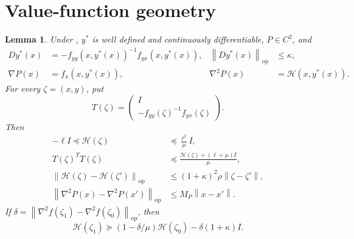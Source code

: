 \documentclass[11pt]{article}
\numberwithin{equation}{section}
\newtheorem{lemma}[assumption]{Lemma}
\newcommand{\norm}[1]{\left\lVert#1\right\rVert}
\newcommand{\op}{\mathrm{op}}
\newcommand{\MP}{M_P}
\begin{document}
\section{Value-function geometry}

\begin{lemma}\label{lem:geometry}
Under , $y^*$ is well defined and continuously
differentiable, $P\in C^2$, and
\begin{align}
 Dy^*(x)&=-f_{yy}(x,y^*(x))^{-1}f_{yx}(x,y^*(x)),
 &\norm{Dy^*(x)}_{\op}&\le\kappa,\label{eq:ystar}\\
 \nabla P(x)&=f_x(x,y^*(x)),
 &\nabla^2P(x)&=\mathcal H(x,y^*(x)).\label{eq:P-derivatives}
\end{align}
For every $\zeta=(x,y)$, put
\[
 T(\zeta)=\begin{pmatrix}I\\-f_{yy}(\zeta)^{-1}f_{yx}(\zeta)\end{pmatrix}.
\]
Then
\begin{align}
 -\ell I\preceq\mathcal H(\zeta)&\preceq\frac{\ell^2}{\mu}I,
 \label{eq:schur-spectral}\\
 T(\zeta)^TT(\zeta)&\preceq
       \frac{\mathcal H(\zeta)+(\ell+\mu)I}{\mu},
 \label{eq:relative-geometry}\\
 \norm{\mathcal H(\zeta)-\mathcal H(\zeta')}_{\op}
 &\le(1+\kappa)^2\rho\norm{\zeta-\zeta'},
 \label{eq:schur-lipschitz}\\
 \norm{\nabla^2P(x)-\nabla^2P(x')}_{\op}
 &\le\MP\norm{x-x'}.
 \label{eq:P-lipschitz}
\end{align}
If $\delta=\norm{\nabla^2f(\zeta_1)-\nabla^2f(\zeta_0)}_{\op}$,
then
\begin{equation}\label{eq:schur-comparison}
 \mathcal H(\zeta_1)\succeq
 (1-\delta/\mu)\mathcal H(\zeta_0)
 -\delta(1+\kappa)I.
\end{equation}
\end{lemma}
\end{document}
